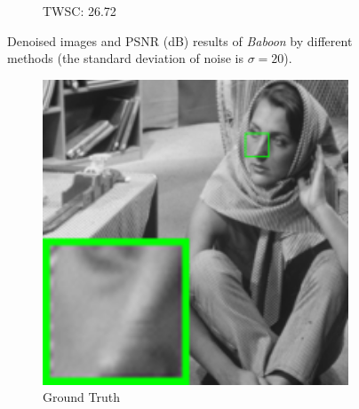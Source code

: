 \begin{figure}
\begin{adjustwidth}{-2cm}{}
\begin{subfigure}[t]{0.19\textwidth}
		\caption{TWSC: 26.72}
    \end{subfigure}
    \caption{Denoised images and PSNR (dB) results of \textsl{Baboon} by different methods (the standard deviation of noise is $\sigma=20$).}
    \label{fig6}
\end{adjustwidth}
\end{figure}



\begin{figure}
\begin{adjustwidth}{-2cm}{}
    \centering
    \begin{subfigure}[t]{0.19\textwidth}
        \centering
        \includegraphics[width=1\textwidth]{images/twsc/awgn/resize_br_barbara.png}
	   \caption{Ground Truth}
    \end{subfigure}
    \hfill
    \begin{subfigure}[t]{0.19\textwidth}
        \centering

\end{subfigure}
\end{adjustwidth}
\end{figure}
